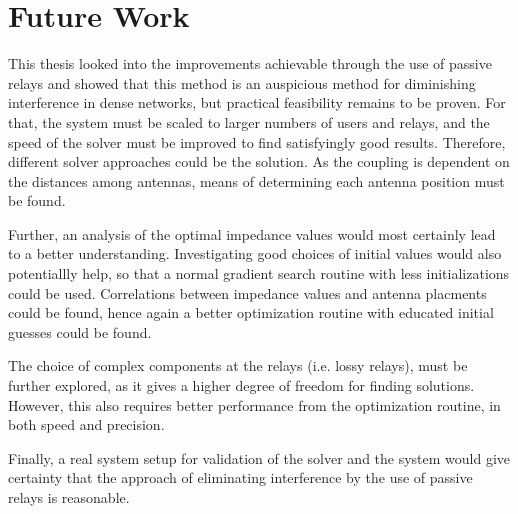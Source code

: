 \section{Future Work}
\label{sec:outlook}
This thesis looked into the improvements achievable through the use of passive relays and showed that this method is an auspicious method for diminishing interference in dense networks, but practical feasibility remains to be proven.
For that, the system must be scaled to larger numbers of users and relays, and the speed of the solver must be improved to find satisfyingly good results.
Therefore, different solver approaches could be the solution.
As the coupling is dependent on the distances among antennas, means of determining each antenna position must be found.

Further, an analysis of the optimal impedance values would most certainly lead to a better understanding.
Investigating good choices of initial values would also potentiallly help, so that a normal gradient search routine with less initializations could be used.
Correlations between impedance values and antenna placments could be found, hence again a better optimization routine with educated initial guesses could be found.

The choice of complex components at the relays (i.e. lossy relays), must be further explored, as it gives a higher degree of freedom for finding solutions.
However, this also requires better performance from the optimization routine, in both speed and precision.

Finally, a real system setup for validation of the solver and the system would give certainty that the approach of eliminating interference by the use of passive relays is reasonable.

